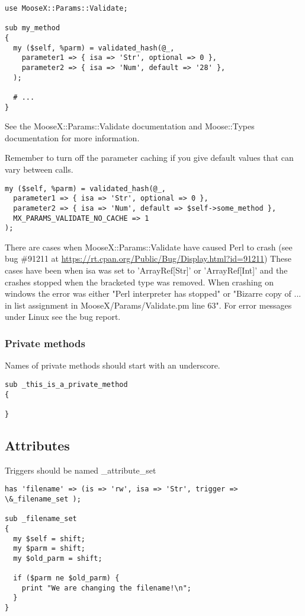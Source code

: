 \begin{verbatim}
use MooseX::Params::Validate;

sub my_method
{
  my ($self, %parm) = validated_hash(@_,
    parameter1 => { isa => 'Str', optional => 0 },
    parameter2 => { isa => 'Num', default => '28' },
  );

  # ...
}
\end{verbatim}

See the MooseX::Params::Validate documentation \cite{params} and Moose::Types documentation \cite{types} for more information.

Remember to turn off the parameter caching if you give default values that can vary between calls.

\begin{verbatim}
my ($self, %parm) = validated_hash(@_,
  parameter1 => { isa => 'Str', optional => 0 },
  parameter2 => { isa => 'Num', default => $self->some_method },
  MX_PARAMS_VALIDATE_NO_CACHE => 1
);
\end{verbatim}

There are cases when MooseX::Params::Validate have caused Perl to crash (see bug \#91211 at \url{https://rt.cpan.org/Public/Bug/Display.html?id=91211})
These cases have been when isa was set to 'ArrayRef[Str]' or 'ArrayRef[Int]' and the crashes stopped when the bracketed type was removed. When crashing on windows the error was either "Perl interpreter has stopped" or "Bizarre copy of ... in list assignment in MooseX/Params/Validate.pm line 63". For error messages under Linux see the bug report.


\subsubsection{Private methods}

Names of private methods should start with an underscore.
\begin{verbatim}
sub _this_is_a_private_method
{

}
\end{verbatim}
\newpage

\subsection{Attributes}
Triggers should be named \_attribute\_set
\begin{verbatim}
has 'filename' => (is => 'rw', isa => 'Str', trigger => \&_filename_set );

sub _filename_set
{
  my $self = shift;
  my $parm = shift;
  my $old_parm = shift;

  if ($parm ne $old_parm) {
    print "We are changing the filename!\n";
  }
}
\end{verbatim}

